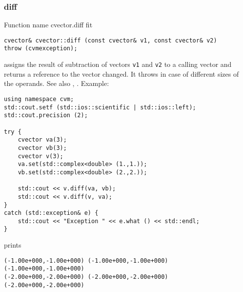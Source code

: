 \subsubsection{diff}
Function%
\pdfdest name {cvector.diff} fit
\begin{verbatim}
cvector& cvector::diff (const cvector& v1, const cvector& v2)
throw (cvmexception);
\end{verbatim}
assigns the result of subtraction of
vectors \verb"v1" and \verb"v2" to a calling vector
and returns a reference to
the vector changed.
It throws  
in case of different sizes of the operands.
See also ,
.
Example:
\begin{Verbatim}
using namespace cvm;
std::cout.setf (std::ios::scientific | std::ios::left);
std::cout.precision (2);

try {
    cvector va(3);
    cvector vb(3);
    cvector v(3);
    va.set(std::complex<double> (1.,1.));
    vb.set(std::complex<double> (2.,2.));

    std::cout << v.diff(va, vb);
    std::cout << v.diff(v, va);
}
catch (std::exception& e) {
    std::cout << "Exception " << e.what () << std::endl;
}
\end{Verbatim}
prints
\begin{Verbatim}
(-1.00e+000,-1.00e+000) (-1.00e+000,-1.00e+000) (-1.00e+000,-1.00e+000)
(-2.00e+000,-2.00e+000) (-2.00e+000,-2.00e+000) (-2.00e+000,-2.00e+000)
\end{Verbatim}
\newpage



